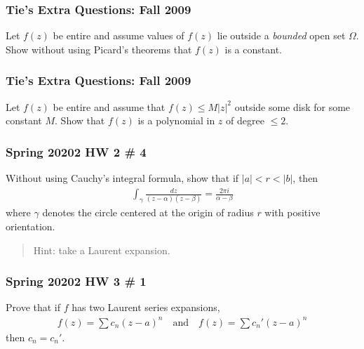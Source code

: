 \hypertarget{ties-extra-questions-fall-2009-3}{%
\subsubsection{Tie's Extra Questions: Fall
2009}\label{ties-extra-questions-fall-2009-3}}

Let \(f(z)\) be entire and assume values of \(f(z)\) lie outside a
\emph{bounded} open set \(\Omega\). Show without using Picard's theorems
that \(f(z)\) is a constant.

\hypertarget{ties-extra-questions-fall-2009-4}{%
\subsubsection{Tie's Extra Questions: Fall
2009}\label{ties-extra-questions-fall-2009-4}}

Let \(f(z)\) be entire and assume that \(f(z) \leq M |z|^2\) outside
some disk for some constant \(M\). Show that \(f(z)\) is a polynomial in
\(z\) of degree \(\leq 2\).

\hypertarget{spring-20202-hw-2-4}{%
\subsubsection{Spring 20202 HW 2 \# 4}\label{spring-20202-hw-2-4}}

Without using Cauchy's integral formula, show that if
\({\left\lvert {a} \right\rvert} < r < {\left\lvert {b} \right\rvert}\),
then
\begin{align*}
\int_{\gamma} \frac{d z}{(z-\alpha)(z-\beta)}=\frac{2 \pi i}{\alpha-\beta}
\end{align*}
where \(\gamma\) denotes the circle centered at the origin of radius
\(r\) with positive orientation.

\begin{quote}
Hint: take a Laurent expansion.
\end{quote}

\hypertarget{spring-20202-hw-3-1}{%
\subsubsection{Spring 20202 HW 3 \# 1}\label{spring-20202-hw-3-1}}

Prove that if \(f\) has two Laurent series expansions,
\begin{align*}
f(z) = \sum c_n(z-a)^n \quad\text{and}\quad f(z) = \sum c_n'(z-a)^n
\end{align*}
then \(c_n = c_n'\).

